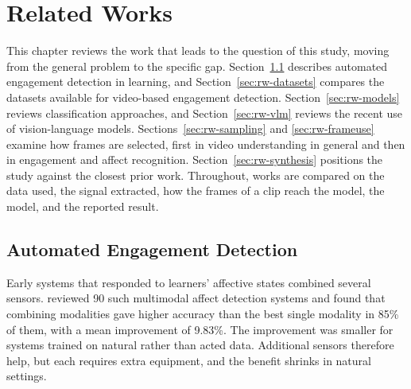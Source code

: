 %
%
%

\chapter{Related Works}
\label{sec:relatedworks}

This chapter reviews the work that leads to the question of this study, moving from the general problem to the specific gap. Section~\ref{sec:rw-detection} describes automated engagement detection in learning, and Section~\ref{sec:rw-datasets} compares the datasets available for video-based engagement detection. Section~\ref{sec:rw-models} reviews classification approaches, and Section~\ref{sec:rw-vlm} reviews the recent use of vision-language models. Sections~\ref{sec:rw-sampling} and \ref{sec:rw-frameuse} examine how frames are selected, first in video understanding in general and then in engagement and affect recognition. Section~\ref{sec:rw-synthesis} positions the study against the closest prior work. Throughout, works are compared on the data used, the signal extracted, how the frames of a clip reach the model, the model, and the reported result.



\section{Automated Engagement Detection}
\label{sec:rw-detection}

Early systems that responded to learners' affective states combined several sensors.  reviewed 90 such multimodal affect detection systems and found that combining modalities gave higher accuracy than the best single modality in 85\% of them, with a mean improvement of 9.83\%. The improvement was smaller for systems trained on natural rather than acted data. Additional sensors therefore help, but each requires extra equipment, and the benefit shrinks in natural settings.

